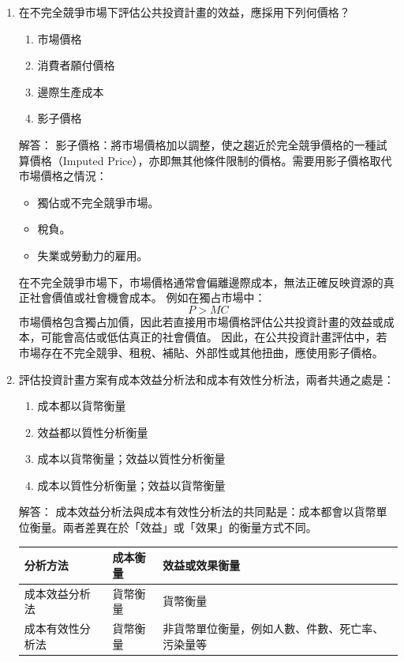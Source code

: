 \documentclass[12pt, a4paper]{article}
\begin{document}
\begin{enumerate}
    \item 在不完全競爭市場下評估公共投資計畫的效益，應採用下列何價格？
    \begin{enumerate}[label=\Alph*.]
        \item 市場價格
        \item 消費者願付價格
        \item 邊際生產成本
        \item 影子價格
    \end{enumerate}
    解答：
    影子價格：將市場價格加以調整，使之趨近於完全競爭價格的一種試算價格（Imputed Price），亦即無其他條件限制的價格。需要用影子價格取代市場價格之情況：
    \begin{itemize}
        \item 獨佔或不完全競爭市場。
        \item 稅負。
        \item 失業或勞動力的雇用。
    \end{itemize}
    在不完全競爭市場下，市場價格通常會偏離邊際成本，無法正確反映資源的真正社會價值或社會機會成本。
    例如在獨占市場中：
    \[
    P > MC
    \]
    市場價格包含獨占加價，因此若直接用市場價格評估公共投資計畫的效益或成本，可能會高估或低估真正的社會價值。
    因此，在公共投資計畫評估中，若市場存在不完全競爭、租稅、補貼、外部性或其他扭曲，應使用影子價格。

    \item 評估投資計畫方案有成本效益分析法和成本有效性分析法，兩者共通之處是：
    \begin{enumerate}[label=\Alph*.]
        \item 成本都以貨幣衡量
        \item 效益都以質性分析衡量
        \item 成本以貨幣衡量；效益以質性分析衡量
        \item 成本以質性分析衡量；效益以貨幣衡量
    \end{enumerate}
    解答：
    成本效益分析法與成本有效性分析法的共同點是：成本都會以貨幣單位衡量。兩者差異在於「效益」或「效果」的衡量方式不同。
    \begin{table}[htbp]
    \centering
    \renewcommand{\arraystretch}{1.5} %

    \begin{tabularx}{\linewidth}{|l|l|>{\raggedright\arraybackslash}X|}
        \hline
        \textbf{分析方法} & \textbf{成本衡量} & \textbf{效益或效果衡量} \\ \hline
        成本效益分析法 & 貨幣衡量 & 貨幣衡量 \\ \hline
        成本有效性分析法 & 貨幣衡量 & 非貨幣單位衡量，例如人數、件數、死亡率、污染量等 \\ \hline
    \end{tabularx}
    \end{table}


\end{enumerate}
\end{document}
